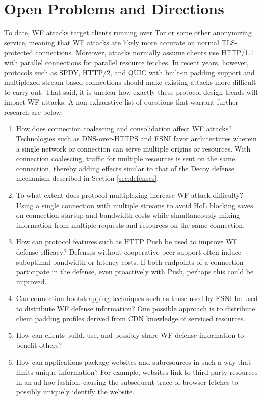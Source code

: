 \documentclass[runningheads]{llncs}
\begin{document}
\section{Open Problems and Directions}
To date, WF attacks target clients running over Tor or some other anonymizing service, meaning that WF
attacks are likely more accurate on normal TLS-protected connections. Moreover, attacks normally assume clients
use HTTP/1.1 with parallel connections for parallel resource fetches. In recent years, however, protocols
such as SPDY, HTTP/2, and QUIC with built-in padding support and multiplexed stream-based connections
should make existing attacks more difficult to carry out. That said, it is unclear how exactly these protocol
design trends will impact WF attacks. A non-exhaustive list of questions that warrant further research
are below:

\begin{enumerate}
\item How does connection coalescing and consolidation affect WF attacks? Technologies such as DNS-over-HTTPS
and ESNI favor architectures wherein a single network or connection can serve multiple origins or resources.
With connection coalescing, traffic for multiple resources is sent on the same connection, thereby adding
effects similar to that of the Decoy defense mechanism described in Section \ref{sec:defenses}.
\item To what extent does protocol multiplexing increase WF attack difficulty? Using a single connection
with multiple streams to avoid HoL blocking saves on connection startup and bandwidth costs while simultaneously
mixing information from multiple requests and resources on the same connection.
\item How can protocol features such as HTTP Push be used to improve WF defense efficacy? Defenses without
cooperative peer support often induce suboptimal bandwidth or latency costs. If both endpoints of a connection
participate in the defense, even proactively with Push, perhaps this could be improved.
\item Can connection bootstrapping techniques such as those used by ESNI be used to distribute WF defense
information? One possible approach is to distribute client padding profiles derived from CDN knowledge
of serviced resources.
\item How can clients build, use, and possibly share WF defense information to benefit others?
\item How can applications package websites and subresources in such a way that limits unique information?
For example, websites link to third party resources in an ad-hoc fashion, causing the subsequent trace of
browser fetches to possibly uniquely identify the website.
\end{enumerate}
\end{document}
